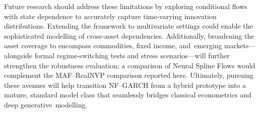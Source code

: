 \documentclass[risks,article,accept,pdftex,moreauthors]{Definitions/mdpi}
\begin{document}
Future research should address these limitations by exploring conditional flows with state dependence to accurately capture time-varying innovation distributions. Extending the framework to multivariate settings could enable the sophisticated modelling of cross-asset dependencies. Additionally, broadening the asset coverage to encompass commodities, fixed income, and~emerging markets—alongside formal regime-switching tests and stress scenarios—will further strengthen the robustness evaluation; a comparison of Neural Spline Flows \citep{durkan2019neural} would complement the MAF--RealNVP comparison reported here. Ultimately, pursuing these avenues will help transition NF–GARCH from a hybrid prototype into a mature, standard model class that seamlessly bridges classical econometrics and deep generative~modelling.


\clearpage
\vspace{6pt} 




\end{document}
